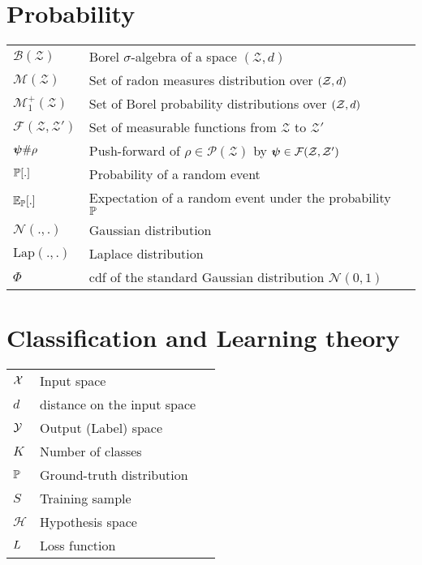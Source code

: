 \section*{Probability}
\begin{tabular}{lll} 
$\mathcal{B}\left(\mathcal{Z}\right)$ & Borel $\sigma$-algebra of a space $(\mathcal{Z},d)$ \\
$\mathcal{M}\left(\mathcal{Z} \right)$ & Set of radon measures distribution over $(\mathcal{Z},d)$ \\
$\mathcal{M}_1^+\left(\mathcal{Z} \right)$ & Set of Borel probability distributions over $(\mathcal{Z},d)$ \\

$\mathcal{F}(\mathcal{Z},\mathcal{Z}')$ & Set of measurable functions from $\mathcal{Z}$ to $\mathcal{Z}'$ \\
$\vectorsym{\psi} \# \rho$ & Push-forward of $\rho \in \mathcal{P}\left(\mathcal{Z} \right)$ by $\vectorsym{\psi} \in \mathcal{F}(\mathcal{Z},\mathcal{Z}')$ \\
$\mathbb{P}[.]$ & Probability of a random event \\
$\mathbb{E}_{\mathbb{P}}[.]$ & Expectation of a random event under the probability $\mathbb{P}$ \\

$\mathcal{N}(. , .)$ & Gaussian distribution \\
$\text{Lap}(.,.)$ & Laplace distribution \\
$\Phi$ & cdf of the standard Gaussian distribution $\mathcal{N}(0,1)$\\ 
\end{tabular}

\section*{Classification and Learning theory}
\begin{tabular}{lll} 
$\mathcal{X}$ & Input space \\
$d$ & distance on the input space \\
$\mathcal{Y}$ & Output (Label) space \\
$K$ & Number of classes \\
$\mathbb{P}$ & Ground-truth distribution \\
$S$ & Training sample \\
$\mathcal{H}$ & Hypothesis space \\ 
$L$ & Loss function \\
\end{tabular}

